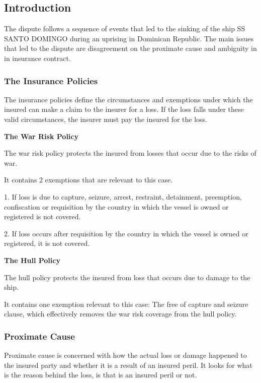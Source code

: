 \subsection{Introduction}

The dispute follows a sequence of events that led to the sinking of the ship SS SANTO DOMINGO during an uprising in Dominican Republic.
The main issues that led to the dispute are disagreement on the proximate cause and ambiguity in in insurance contract.


\subsubsection{The Insurance Policies}

The insurance policies define the circumstances and exemptions under which the insured can make a claim to the insurer for a loss. If the loss falls under these valid circumstances, the insurer must pay the insured for the loss.

\textbf{The War Risk Policy}

The war risk policy protects the insured from losses that occur due to the risks of war.

It contains 2 exemptions that are relevant to this case.

1. If loss is due to capture, seizure, arrest, restraint, detainment, preemption, confiscation or requisition by the country in which the vessel is owned or registered is not covered.

2. If loss occurs after requisition by the country in which the vessel is owned or registered, it is not covered.

\textbf{The Hull Policy}

The hull policy protects the insured from loss that occurs due to damage to the ship.

It contains one exemption relevant to this case: The free of capture and seizure clause, which effectively removes the war risk coverage from the hull policy.  

\subsubsection{Proximate Cause}

Proximate cause is concerned with how the actual loss or damage happened to the insured party and whether it is a result of an insured peril. It looks for what is the reason behind the loss, is that is an insured peril or not.

